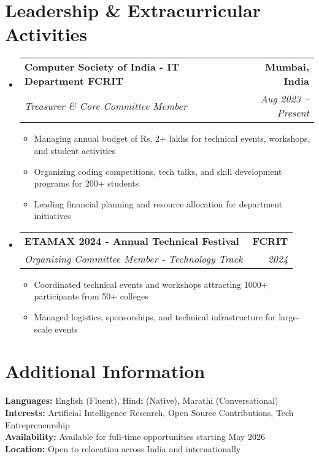 \documentclass[letterpaper,11pt]{article}
\makeatletter
\newcommand{\resumeItem}[1]{
  \item\small{
    {#1 \vspace{-2pt}}
  }
}
\newcommand{\resumeSubheading}[4]{
  \vspace{-2pt}\item
    \begin{tabular*}{1.0\textwidth}[t]{l@{\extracolsep{\fill}}r}
      \textbf{#1} & \textbf{\small #2} \\
      \textit{\small#3} & \textit{\small #4} \\
    \end{tabular*}\vspace{-7pt}
}
\newcommand{\resumeSubHeadingListStart}{\begin{itemize}[leftmargin=0.0in, label={}]}
\newcommand{\resumeSubHeadingListEnd}{\end{itemize}}
\newcommand{\resumeItemListStart}{\begin{itemize}}
\newcommand{\resumeItemListEnd}{\end{itemize}\vspace{-5pt}}
\makeatother
\begin{document}
\section{Leadership \& Extracurricular Activities}
    \resumeSubHeadingListStart
      \resumeSubheading
        {Computer Society of India - IT Department FCRIT}{Mumbai, India}
        {Treasurer \& Core Committee Member}{Aug 2023 -- Present}
        \resumeItemListStart
          \resumeItem{Managing annual budget of Rs. 2+ lakhs for technical events, workshops, and student activities}
          \resumeItem{Organizing coding competitions, tech talks, and skill development programs for 200+ students}
          \resumeItem{Leading financial planning and resource allocation for department initiatives}
        \resumeItemListEnd
        
      \resumeSubheading
        {ETAMAX 2024 - Annual Technical Festival}{FCRIT}
        {Organizing Committee Member - Technology Track}{2024}
        \resumeItemListStart
          \resumeItem{Coordinated technical events and workshops attracting 1000+ participants from 50+ colleges}
          \resumeItem{Managed logistics, sponsorships, and technical infrastructure for large-scale events}
        \resumeItemListEnd
    \resumeSubHeadingListEnd

\section{Additional Information}
\small{
\textbf{Languages:} English (Fluent), Hindi (Native), Marathi (Conversational) \\
\textbf{Interests:} Artificial Intelligence Research, Open Source Contributions, Tech Entrepreneurship \\
\textbf{Availability:} Available for full-time opportunities starting May 2026 \\
\textbf{Location:} Open to relocation across India and internationally
}
\end{document}
